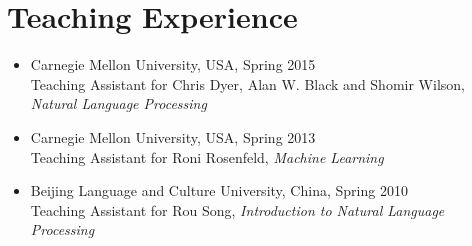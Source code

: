 \documentclass[letterpaper]{article}
\begin{document}
\section*{Teaching Experience}
\begin{itemize}
\item Carnegie Mellon University, USA, Spring 2015\\
Teaching Assistant for Chris Dyer, Alan W. Black and Shomir Wilson, {\it Natural Language Processing}
\item Carnegie Mellon University, USA, Spring 2013\\
Teaching Assistant for Roni Rosenfeld, {\it Machine Learning}
\item Beijing Language and Culture University, China, Spring 2010\\
Teaching Assistant for Rou Song, {\it Introduction to Natural Language Processing}
\end{itemize}
\end{document}
